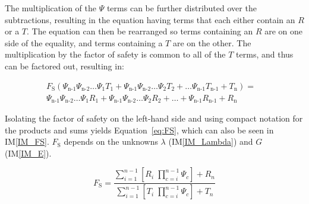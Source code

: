 \documentclass[12pt]{article}
\newcommand{\iref}[1]{IM\ref{#1}}
\begin{document}
\noindent The multiplication of the $\Psi$ terms can be further distributed 
over the subtractions, resulting in the equation having terms that each either 
contain an $R$ or a $T$. The equation can then be rearranged so terms 
containing an $R$ are on one side of the equality, and terms containing a $T$ 
are on the other. The multiplication by the factor of safety is common to all 
of the $T$ terms, and thus can be factored out, resulting in:

\begin{equation*}
\begin{split}
F_\text{S} \left( \Psi_\text{n-1} \Psi_\text{n-2} \dots \Psi_\text{1} 
T_\text{1} + \Psi_\text{n-1} \Psi_\text{n-2} \dots \Psi_\text{2} T_\text{2} + 
\dots \Psi_\text{n-1} T_\text{n-1} + T_\text{n} \right) =&\\ \Psi_\text{n-1} 
\Psi_\text{n-2} 
\dots \Psi_\text{1} R_\text{1} + \Psi_\text{n-1} \Psi_\text{n-2} \dots 
\Psi_\text{2} R_\text{2} + \dots + \Psi_\text{n-1} R_\text{n-1} + R_\text{n}
\end{split}
\end{equation*}

\noindent Isolating the factor of safety on the left-hand side and using 
compact notation 
for the products and sums yields Equation~\ref{eq:FS}, which can also be seen 
in \iref{IM_FS}. $F_\text{S}$ depends on the unknowns $\lambda$ 
(\iref{IM_Lambda}) and $G$ (\iref{IM_E}).

\begin{equation} \label{eq:FS}
{F_\text{S}}= \frac{\displaystyle\sum_{i=1}^{n-1} \left[ {R_{i}}
	\;{\displaystyle\prod_{c=i}^{n-1} \Psi_{c}
	}\right] + {R_{n}} }{\displaystyle\sum_{i=1}^{n-1} \left[ {T_{i}}
	\;{\displaystyle\prod_{c=i}^{n-1} \Psi_{c}
	}\right] + {T_{n}} }
\end{equation}

\end{document}
